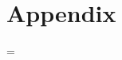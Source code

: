 \documentclass[10pt]{article}
\begin{document}




\section{Appendix}


\bibspacing=




\clearpage
\end{document}
